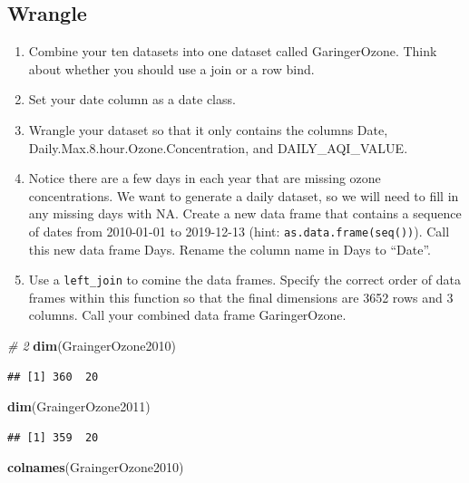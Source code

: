\documentclass[]{article}
\newenvironment{Shaded}{\begin{snugshade}}{\end{snugshade}}
\newcommand{\CommentTok}[1]{\textcolor[rgb]{0.56,0.35,0.01}{\textit{#1}}}
\newcommand{\KeywordTok}[1]{\textcolor[rgb]{0.13,0.29,0.53}{\textbf{#1}}}
\newcommand{\NormalTok}[1]{#1}
\begin{document}
\hypertarget{wrangle}{%
\subsection{Wrangle}\label{wrangle}}

\begin{enumerate}
\def\labelenumi{\arabic{enumi}.}
\setcounter{enumi}{1}
\item
  Combine your ten datasets into one dataset called GaringerOzone. Think
  about whether you should use a join or a row bind.
\item
  Set your date column as a date class.
\item
  Wrangle your dataset so that it only contains the columns Date,
  Daily.Max.8.hour.Ozone.Concentration, and DAILY\_AQI\_VALUE.
\item
  Notice there are a few days in each year that are missing ozone
  concentrations. We want to generate a daily dataset, so we will need
  to fill in any missing days with NA. Create a new data frame that
  contains a sequence of dates from 2010-01-01 to 2019-12-13 (hint:
  \texttt{as.data.frame(seq())}). Call this new data frame Days. Rename
  the column name in Days to ``Date''.
\item
  Use a \texttt{left\_join} to comine the data frames. Specify the
  correct order of data frames within this function so that the final
  dimensions are 3652 rows and 3 columns. Call your combined data frame
  GaringerOzone.
\end{enumerate}

\begin{Shaded}
\begin{Highlighting}[]
\CommentTok{# 2 }
\KeywordTok{dim}\NormalTok{(GraingerOzone2010)}
\end{Highlighting}
\end{Shaded}

\begin{verbatim}
## [1] 360  20
\end{verbatim}

\begin{Shaded}
\begin{Highlighting}[]
\KeywordTok{dim}\NormalTok{(GraingerOzone2011)}
\end{Highlighting}
\end{Shaded}

\begin{verbatim}
## [1] 359  20
\end{verbatim}

\begin{Shaded}
\begin{Highlighting}[]
\KeywordTok{colnames}\NormalTok{(GraingerOzone2010)}
\end{Highlighting}
\end{Shaded}
\end{document}
